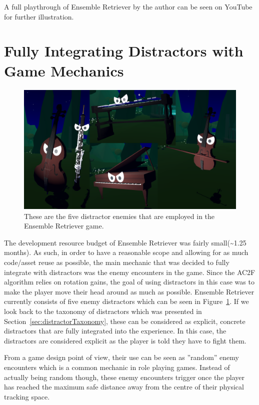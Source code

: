 A full playthrough of Ensemble Retriever by the author can be seen on YouTube~\cite{ERPlaythrough} for further illustration.

\section{Fully Integrating Distractors with Game Mechanics}
\begin{figure}[tbph]
    \centering
    \includegraphics[width=1\textwidth]{figures/screenshots/Distractors.png}
    \caption[The Distractors of Ensemble Retriever]{These are the five distractor enemies that are employed in the Ensemble Retriever game.}
    \label{fig:allDistractors}
\end{figure}

The development resource budget of Ensemble Retriever was fairly small(\textasciitilde1.25 months). As such, in order to have a reasonable scope and allowing for as much code/asset reuse as possible, the main mechanic that was decided to fully integrate with distractors was the enemy encounters in the game. Since the AC2F algorithm relies on rotation gains, the goal of using distractors in this case was to make the player move their head around as much as possible. Ensemble Retriever currently consists of five enemy distractors which can be seen in Figure~\ref{fig:allDistractors}. If we look back to the taxonomy of distractors which was presented in Section~\ref{sec:distractorTaxonomy}, these can be considered as explicit, concrete distractors that are fully integrated into the experience. In this case, the distractors are considered explicit as the player is told they have to fight them. 

From a game design point of view, their use can be seen as ''random'' enemy encounters which is a common mechanic in role playing games. Instead of actually being random though, these enemy encounters trigger once the player has reached the maximum safe distance away from the centre of their physical tracking space. 

